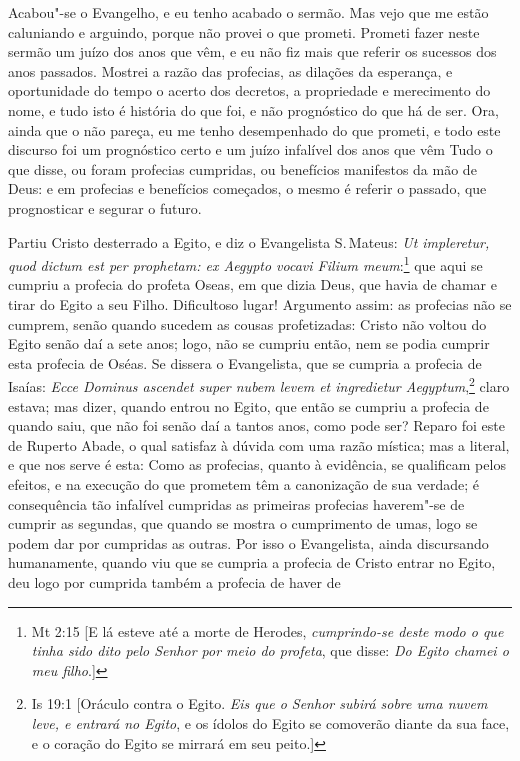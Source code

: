 Acabou"-se o Evangelho, e eu tenho acabado o sermão. Mas vejo que me
estão caluniando e arguindo, porque não provei o que prometi. Prometi
fazer neste sermão um juízo dos anos que vêm, e eu não fiz mais que
referir os sucessos dos anos passados. Mostrei a razão das profecias, as
dilações da esperança, e oportunidade do tempo o acerto dos decretos, a
propriedade e merecimento do nome, e tudo isto é história do que foi, e
não prognóstico do que há de ser. Ora, ainda que o não pareça, eu me
tenho desempenhado do que prometi, e todo este discurso foi um
prognóstico certo e um juízo infalível dos anos que vêm Tudo o que
disse, ou foram profecias cumpridas, ou benefícios manifestos da mão de
Deus: e em profecias e benefícios começados, o mesmo é referir o
passado, que prognosticar e segurar o futuro.

Partiu Cristo desterrado a Egito, e diz o Evangelista S.\,Mateus:
\emph{Ut impleretur, quod dictum est per prophetam: ex Aegypto vocavi
Filium meum}:\footnote{Mt 2:15 [E lá esteve até a morte de Herodes, \textit{cumprindo-se deste modo o que tinha sido dito pelo Senhor por meio do profeta}, que disse: \textit{Do Egito chamei o meu filho}.]} que aqui se cumpriu a profecia do profeta Oseas, em que
dizia Deus, que havia de chamar e tirar do Egito a seu Filho.
Dificultoso lugar! Argumento assim: as profecias não se cumprem, senão
quando sucedem as cousas profetizadas: Cristo não voltou do Egito senão
daí a sete anos; logo, não se cumpriu então, nem se podia cumprir esta
profecia de Oséas. Se dissera o Evangelista, que se cumpria a profecia
de Isaías: \emph{Ecce Dominus ascendet super nubem levem et ingredietur
Aegyptum},\footnote{Is 19:1 [Oráculo contra o Egito. \textit{Eis que o Senhor subirá sobre uma nuvem leve, e entrará no Egito}, e os ídolos do Egito se comoverão diante da sua face, e o coração do Egito se mirrará em seu peito.]} claro estava; mas dizer, quando entrou no Egito, que então se
cumpriu a profecia de quando saiu, que não foi senão daí a tantos anos,
como pode ser? Reparo foi este de Ruperto Abade, o qual satisfaz à
dúvida com uma razão mística; mas a literal, e que nos serve é esta:
Como as profecias, quanto à evidência, se qualificam pelos efeitos, e na
execução do que prometem têm a canonização de sua verdade; é
consequência tão infalível cumpridas as primeiras profecias haverem"-se
de cumprir as segundas, que quando se mostra o cumprimento de umas, logo
se podem dar por cumpridas as outras. Por isso o Evangelista, ainda
discursando humanamente, quando viu que se cumpria a profecia de Cristo
entrar no Egito, deu logo por cumprida também a profecia de haver de

